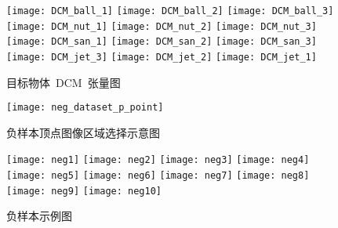 \begin{figure}[t] %
  \centering%
    \texttt{[image: DCM\_ball\_1]}\hspace{0.5em}
    \texttt{[image: DCM\_ball\_2]}\hspace{0.5em}
    \texttt{[image: DCM\_ball\_3]}\hspace{0.5em}
    \texttt{[image: DCM\_nut\_1]}\hspace{0.5em}
    \texttt{[image: DCM\_nut\_2]}\hspace{0.5em}
    \texttt{[image: DCM\_nut\_3]}
    \vskip 1.5pt
    \texttt{[image: DCM\_san\_1]}\hspace{1em}
    \texttt{[image: DCM\_san\_2]}\hspace{1em}
    \texttt{[image: DCM\_san\_3]}\hspace{1em}
    \texttt{[image: DCM\_jet\_3]}\hspace{1em}
    \texttt{[image: DCM\_jet\_2]}\hspace{1em}
    \vskip 1.5pt
    \texttt{[image: DCM\_jet\_1]}
  \caption{目标物体~DCM~张量图}
  \label{fig:chap03:DCM_tensor_object_imgs}
  \end{figure}
\begin{figure}[t] %
  \centering%
    \texttt{[image: neg\_dataset\_p\_point]}
  \caption{负样本顶点图像区域选择示意图}
  \label{fig:chap03:neg_dataset_range}
  \end{figure}
  \begin{figure}[t] %
    \centering%
      \texttt{[image: neg1]}\hspace{0.2em}
      \texttt{[image: neg2]}\hspace{0.2em}
      \texttt{[image: neg3]}\hspace{0.2em}
      \texttt{[image: neg4]}\hspace{0.2em}
      \texttt{[image: neg5]}
      \vskip 1.5pt
      \texttt{[image: neg6]}\hspace{0.2em}
      \texttt{[image: neg7]}\hspace{0.2em}
      \texttt{[image: neg8]}\hspace{0.2em}
      \texttt{[image: neg9]}\hspace{0.2em}
      \texttt{[image: neg10]}
    \caption{负样本示例图}
    \label{fig:chap03:neg_img}
    \end{figure}

